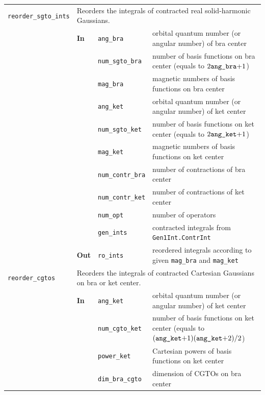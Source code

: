 \documentclass[a4paper,11pt,twoside,openright]{book}
\begin{document}
\begin{center}
\begin{longtable}{l|p{0.8cm}|p{2.5cm}p{7.7cm}}
%
    \hline
    \verb|reorder_sgto_ints|\index{\textsl{public} \texttt{reorder\_sgto\_ints}} & %
      \multicolumn{3}{p{11cm}}{Reorders the integrals of contracted real solid-harmonic Gaussians.}\\
    \cline{2-4}
    & \textbf{In} & \verb|ang_bra| & orbital quantum number (or angular number) of bra center\\
    \cline{3-4}
    & & \verb|num_sgto_bra| & number of basis functions on bra center (equals to $2\verb|ang_bra|\mathrm{+}1$)\\
    \cline{3-4}
    & & \verb|mag_bra| & magnetic numbers of basis functions on bra center\\
    \cline{3-4}
    & & \verb|ang_ket| & orbital quantum number (or angular number) of ket center\\
    \cline{3-4}
    & & \verb|num_sgto_ket| & number of basis functions on ket center (equals to $2\verb|ang_ket|\mathrm{+}1$)\\
    \cline{3-4}
    & & \verb|mag_ket| & magnetic numbers of basis functions on ket center\\
    \cline{3-4}
    & & \verb|num_contr_bra| & number of contractions of bra center\\
    \cline{3-4}
    & & \verb|num_contr_ket| & number of contractions of ket center\\
    \cline{3-4}
    & & \verb|num_opt| & number of operators\\
    \cline{3-4}
    & & \verb|gen_ints| & contracted integrals from \verb|Gen1Int.ContrInt|\\
    \cline{2-4}
    & \textbf{Out} & \verb|ro_ints| & reordered integrals according to given \verb|mag_bra| and \verb|mag_ket|\\
%
    \hline
    \verb|reorder_cgtos|\index{\textsl{public} \texttt{reorder\_cgtos}} & %
      \multicolumn{3}{p{11cm}}{Reorders the integrals of contracted Cartesian Gaussians on bra or ket center.}\\
    \cline{2-4}
    & \textbf{In} & \verb|ang_ket| & orbital quantum number (or angular number) of ket center\\
    \cline{3-4}
    & & \verb|num_cgto_ket| & number of basis functions on ket center (equals to %
      $(\verb|ang_ket|\mathrm{+}1)(\verb|ang_ket|\mathrm{+}2)/2$)\\
    \cline{3-4}
    & & \verb|power_ket| & Cartesian powers of basis functions on ket center\\
    \cline{3-4}
    & & \verb|dim_bra_cgto| & dimension of CGTOs on bra center\\

\end{longtable}
\end{center}
\end{document}
